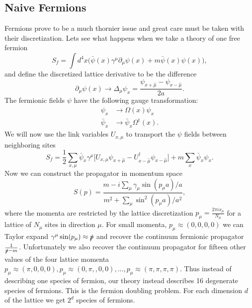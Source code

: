 \subsection{Naive Fermions}
Fermions prove to be a much thornier issue and great care must be taken with their discretization.
Lets see what happens when we take a theory of one free fermion
\begin{equation}
  S_f=\int d^4x\Big(\bar{\psi}(x)\gamma^\mu\partial_\mu\psi(x)+m\bar{\psi}(x)\psi(x)\Big),
\end{equation}
and define the discretized lattice derivative to be the difference 
\begin{equation}
  \partial_\mu\psi(x)\rightarrow\Delta_\mu\psi_x=\frac{\psi_{x+\hat{\mu}}-\psi_{x-\hat{\mu}}}{2a}.
\end{equation}
The fermionic fields $\psi$ have the following gauge transformation:
\begin{equation}
  \begin{aligned}
    \psi_x&\rightarrow\Omega(x)\psi_x \\
    \bar{\psi}_x&\rightarrow\bar{\psi}_x\Omega^\dagger(x).
  \end{aligned}
\end{equation}
We will now use the link variables $U_{x,\mu}$ to transport the $\psi$ fields between neighboring sites
\begin{equation}
  S_f=\frac{1}{2}\sum_{x,\mu} \bar{\psi}_x\gamma^\mu\big[U_{x,\mu}\psi_{x+\hat{\mu}}-U^\dagger_{x-\hat{\mu}}\psi_{x-\hat{\mu}}\big]+m\sum_x \bar{\psi}_x\psi_x.
\end{equation}
Now we can construct the propagator in momentum space
\begin{equation}
  S(p)=\frac{m-i\sum_{\mu}\gamma_\mu\sin(p_\mu a)/a}{m^2+\sum_\mu \sin^2(p_\mu a)/a^2},
\end{equation}
where the momenta are restricted by the lattice discretization $p_\mu=\frac{2\pi ix_\mu}{N_\mu}$ for a lattice of $N_\mu$ sites in direction $\mu$.
For small momenta, $p_\mu \approx (0,0,0,0)$ we can Taylor expand $\gamma^\mu\sin(p_\mu)\approx \slashed{p}$ and recover the continuum fermionic propagator $\frac{1}{\slashed{p}-m}$.
Unfortunately we also recover the continuum propagator for fifteen other values of the four lattice momenta $p_\mu\approx(\pi,0,0,0),p_\mu\approx(0,\pi,,0,0),...,p_\mu\approx(\pi,\pi,\pi,\pi)$.
Thus instead of describing one species of fermion, our theory instead describes 16 degenerate species of fermions.
This is the fermion doubling problem.
For each dimension $d$ of the lattice we get $2^d$ species of fermions.

